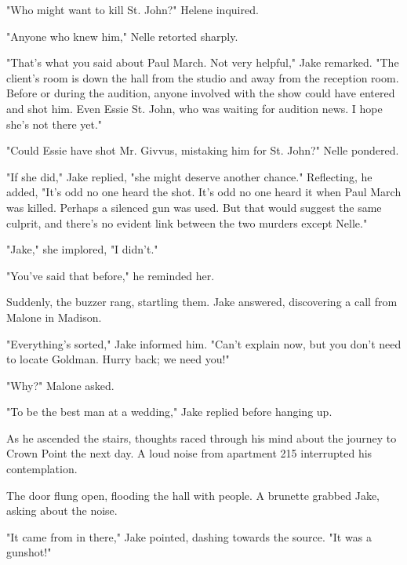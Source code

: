 \documentclass{novel}
\begin{document}
"Who might want to kill St. John?" Helene inquired.

"Anyone who knew him," Nelle retorted sharply.

"That's what you said about Paul March. Not very helpful," Jake remarked. "The client's room is down the hall from the studio and away from the reception room. Before or during the audition, anyone involved with the show could have entered and shot him. Even Essie St. John, who was waiting for audition news. I hope she's not there yet."

"Could Essie have shot Mr. Givvus, mistaking him for St. John?" Nelle pondered.

"If she did," Jake replied, "she might deserve another chance." Reflecting, he added, "It's odd no one heard the shot. It's odd no one heard it when Paul March was killed. Perhaps a silenced gun was used. But that would suggest the same culprit, and there's no evident link between the two murders except Nelle."

"Jake," she implored, "I didn't."

"You've said that before," he reminded her.

Suddenly, the buzzer rang, startling them. Jake answered, discovering a call from Malone in Madison.

"Everything's sorted," Jake informed him. "Can't explain now, but you don't need to locate Goldman. Hurry back; we need you!"

"Why?" Malone asked.

"To be the best man at a wedding," Jake replied before hanging up.

As he ascended the stairs, thoughts raced through his mind about the journey to Crown Point the next day. A loud noise from apartment 215 interrupted his contemplation.

The door flung open, flooding the hall with people. A brunette grabbed Jake, asking about the noise.

"It came from in there," Jake pointed, dashing towards the source. "It was a gunshot!"

\vspace{2\nbs}
\clearpage
\thispagestyle{empty}

\begin{ChapterStart}
\vspace{3\nbs}
\end{ChapterStart}
\end{document}
